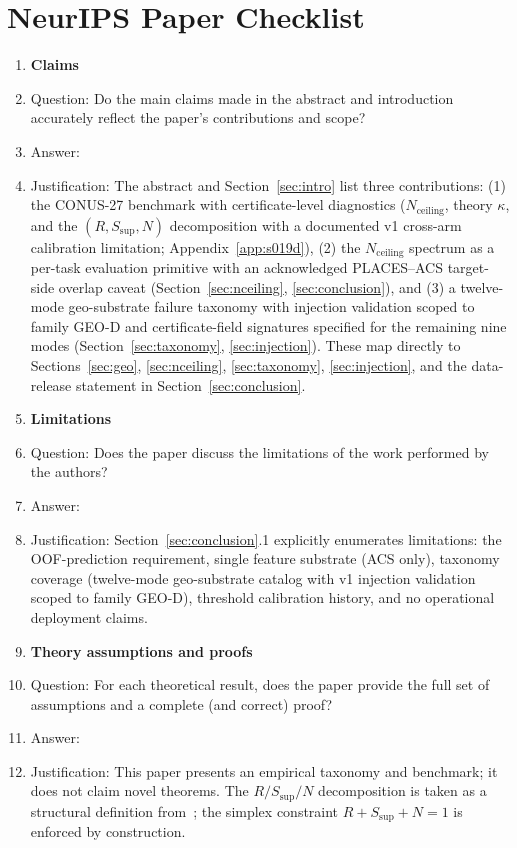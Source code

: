 \documentclass{article}
\begin{document}
\section*{NeurIPS Paper Checklist}

\begin{enumerate}

\item {\bf Claims}
    \item[] Question: Do the main claims made in the abstract and introduction accurately reflect the paper's contributions and scope?
    \item[] Answer: \answerYes{}
    \item[] Justification: The abstract and Section~\ref{sec:intro} list three contributions: (1) the CONUS-27 benchmark with certificate-level diagnostics ($N_{\text{ceiling}}$, theory $\kappa$, and the $(R, S_{\text{sup}}, N)$ decomposition with a documented v1 cross-arm calibration limitation; Appendix~\ref{app:s019d}), (2) the $N_{\text{ceiling}}$ spectrum as a per-task evaluation primitive with an acknowledged PLACES--ACS target-side overlap caveat (Section~\ref{sec:nceiling}, \ref{sec:conclusion}), and (3) a twelve-mode geo-substrate failure taxonomy with injection validation scoped to family GEO-D and certificate-field signatures specified for the remaining nine modes (Section~\ref{sec:taxonomy}, \ref{sec:injection}). These map directly to Sections~\ref{sec:geo}, \ref{sec:nceiling}, \ref{sec:taxonomy}, \ref{sec:injection}, and the data-release statement in Section~\ref{sec:conclusion}.

\item {\bf Limitations}
    \item[] Question: Does the paper discuss the limitations of the work performed by the authors?
    \item[] Answer: \answerYes{}
    \item[] Justification: Section~\ref{sec:conclusion}.1 explicitly enumerates limitations: the OOF-prediction requirement, single feature substrate (ACS only), taxonomy coverage (twelve-mode geo-substrate catalog with v1 injection validation scoped to family GEO-D), threshold calibration history, and no operational deployment claims.

\item {\bf Theory assumptions and proofs}
    \item[] Question: For each theoretical result, does the paper provide the full set of assumptions and a complete (and correct) proof?
    \item[] Answer: \answerNA{}
    \item[] Justification: This paper presents an empirical taxonomy and benchmark; it does not claim novel theorems. The $R/S_{\text{sup}}/N$ decomposition is taken as a structural definition from~\citep{martin2026rsct}; the simplex constraint $R{+}S_{\text{sup}}{+}N{=}1$ is enforced by construction.


\end{enumerate}
\end{document}
